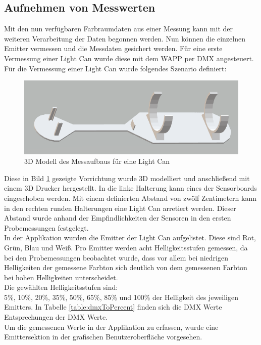 \documentclass[11pt]{scrartcl}
\begin{document}
\subsection{Aufnehmen von Messwerten}
Mit den nun verfügbaren Farbraumdaten aus einer Messung kann mit der weiteren Verarbeitung der Daten begonnen werden. Nun können die einzelnen
Emitter vermessen und die Messdaten gesichert werden. Für eine erste Vermessung einer Light Can wurde diese mit dem WAPP per DMX angesteuert.
Für die Vermessung einer Light Can wurde folgendes Szenario definiert:
\begin{figure}[H]
    \begin{center}
        \includegraphics[width=\textwidth]{images/light_can_holder_3d.png}
    \end{center}
    \caption{3D Modell des Messaufbaus für eine Light Can}\label{fig:3DCanHolder}
\end{figure}
\noindent
Diese in Bild \ref{fig:3DCanHolder} gezeigte Vorrichtung wurde 3D modelliert und anschließend mit einem 3D Drucker hergestellt. In die linke
Halterung kann eines der Sensorboards eingeschoben werden. Mit einem definierten Abstand von zwölf Zentimetern kann in den rechten runden Halterungen
eine Light Can arretiert werden. Dieser Abstand wurde anhand der Empfindlichkeiten der Sensoren in den ersten Probemessungen festgelegt.\\
In der Applikation wurden die Emitter der Light Can aufgelistet. Diese sind Rot, Grün, Blau und Weiß. Pro Emitter werden acht Helligkeitsstufen
gemessen, da bei den Probemessungen beobachtet wurde, dass vor allem bei niedrigen Helligkeiten der gemessene Farbton sich deutlich von dem
gemessenen Farbton bei hohen Helligkeiten unterscheidet.\\
Die gewählten Helligkeitsstufen sind:\\
5\%, 10\%, 20\%, 35\%, 50\%, 65\%, 85\% und 100\% der Helligkeit des jeweiligen Emitters. In Tabelle \ref{table:dmxToPercent} finden sich die DMX Werte
Entsprechungen der DMX Werte.\\
Um die gemessenen Werte in der Applikation zu erfassen, wurde eine Emittersektion in der grafischen Benutzeroberfläche vorgesehen.
\end{document}
